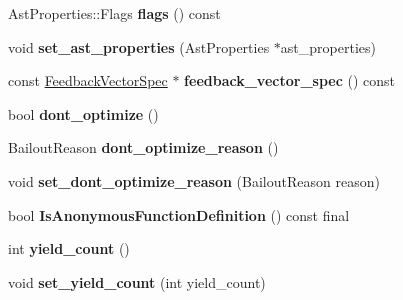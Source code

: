 \begin{DoxyCompactItemize}
\item 
Ast\+Properties\+::\+Flags {\bfseries flags} () const \hypertarget{classv8_1_1internal_1_1_function_literal_a8cee486de4e9eaf930db688f4e8688bc}{}\label{classv8_1_1internal_1_1_function_literal_a8cee486de4e9eaf930db688f4e8688bc}

\item 
void {\bfseries set\+\_\+ast\+\_\+properties} (Ast\+Properties $\ast$ast\+\_\+properties)\hypertarget{classv8_1_1internal_1_1_function_literal_aa6b380bb0cf321fad4d8d1b3499ac5e1}{}\label{classv8_1_1internal_1_1_function_literal_aa6b380bb0cf321fad4d8d1b3499ac5e1}

\item 
const \hyperlink{classv8_1_1internal_1_1_feedback_vector_spec}{Feedback\+Vector\+Spec} $\ast$ {\bfseries feedback\+\_\+vector\+\_\+spec} () const \hypertarget{classv8_1_1internal_1_1_function_literal_ae1020e05c09c35dd4bde755d93eb6581}{}\label{classv8_1_1internal_1_1_function_literal_ae1020e05c09c35dd4bde755d93eb6581}

\item 
bool {\bfseries dont\+\_\+optimize} ()\hypertarget{classv8_1_1internal_1_1_function_literal_ae5bb4631781f580279c78646257df90b}{}\label{classv8_1_1internal_1_1_function_literal_ae5bb4631781f580279c78646257df90b}

\item 
Bailout\+Reason {\bfseries dont\+\_\+optimize\+\_\+reason} ()\hypertarget{classv8_1_1internal_1_1_function_literal_afc61ad6fe5de1249ba8e92c76592fd5a}{}\label{classv8_1_1internal_1_1_function_literal_afc61ad6fe5de1249ba8e92c76592fd5a}

\item 
void {\bfseries set\+\_\+dont\+\_\+optimize\+\_\+reason} (Bailout\+Reason reason)\hypertarget{classv8_1_1internal_1_1_function_literal_a9eafb67cba8eb6da7e118e1890d0c2a5}{}\label{classv8_1_1internal_1_1_function_literal_a9eafb67cba8eb6da7e118e1890d0c2a5}

\item 
bool {\bfseries Is\+Anonymous\+Function\+Definition} () const  final\hypertarget{classv8_1_1internal_1_1_function_literal_a0241640b2a5df4631b391032d050dad4}{}\label{classv8_1_1internal_1_1_function_literal_a0241640b2a5df4631b391032d050dad4}

\item 
int {\bfseries yield\+\_\+count} ()\hypertarget{classv8_1_1internal_1_1_function_literal_a29cdf39b646f18872a00588fe9553654}{}\label{classv8_1_1internal_1_1_function_literal_a29cdf39b646f18872a00588fe9553654}

\item 
void {\bfseries set\+\_\+yield\+\_\+count} (int yield\+\_\+count)\hypertarget{classv8_1_1internal_1_1_function_literal_afebb22d966685aa565235918f1b368b4}{}\label{classv8_1_1internal_1_1_function_literal_afebb22d966685aa565235918f1b368b4}

\end{DoxyCompactItemize}
